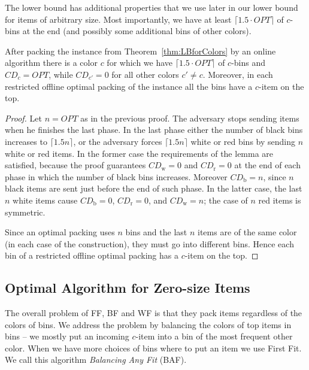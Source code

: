 \documentclass[11pt,a4paper]{article}
\def\vari#1{\mathit{#1}}
\begin{document}
The lower bound has additional properties that we use later in our lower
bound for items of arbitrary size. Most importantly, we have at least
$\lceil 1.5\cdot \vari{OPT} \rceil$ of $c$-bins at the end (and
possibly some additional bins of other colors).

\begin{lemma} \label{l:LBforColorsInstance}
After packing the instance from Theorem~\ref{thm:LBforColors} by an online algorithm
there is a color $c$
for which we have $\lceil 1.5\cdot \vari{OPT} \rceil$ of $c$-bins and $\vari{CD}_{c} = \vari{OPT}$,
while $\vari{CD}_{c'} = 0$ for all other colors $c' \neq c$.
Moreover, in each restricted offline optimal packing of the instance all the bins have a $c$-item on the top.
\end{lemma}

\begin{proof}
Let $n = \vari{OPT}$ as in the previous proof. 
The adversary stops sending items when he finishes the last phase. In the last phase either
the number of black bins increases to $\lceil 1.5n\rceil$, or the adversary forces $\lceil 1.5n\rceil$
white or red bins by sending $n$ white or red items. In the former case the requirements
of the lemma are satisfied, because the proof guarantees $\vari{CD}_{\mathrm{w}} = 0$ and $\vari{CD}_{\mathrm{r}} = 0$
at the end of each phase in which the number of black bins increases. Moreover $\vari{CD}_{\mathrm{b}} = n$,
since $n$ black items are sent just before the end of such phase.
In the latter case, the last $n$ white items cause $\vari{CD}_{\mathrm{b}} = 0$, $\vari{CD}_{\mathrm{r}} = 0$, and
$\vari{CD}_{\mathrm{w}} = n$; the case of $n$ red items is symmetric.

Since an optimal packing uses $n$ bins and the last $n$ items are of the same color (in each case of the construction), 
they must go into different bins. Hence each bin of a restricted offline optimal packing has a $c$-item on the top.
\end{proof}

\subsection{Optimal Algorithm for Zero-size Items}\label{sec:zeroSizeUB}

The overall problem of FF, BF and WF is that they pack items regardless of the colors of bins.
We address the problem by balancing the colors of top items in bins
-- we mostly put an incoming $c$-item into a bin of
the most frequent other color.
When we have more choices of bins where to put an item we use First Fit.
We call this algorithm \textit{Balancing Any Fit} (BAF).
\end{document}
